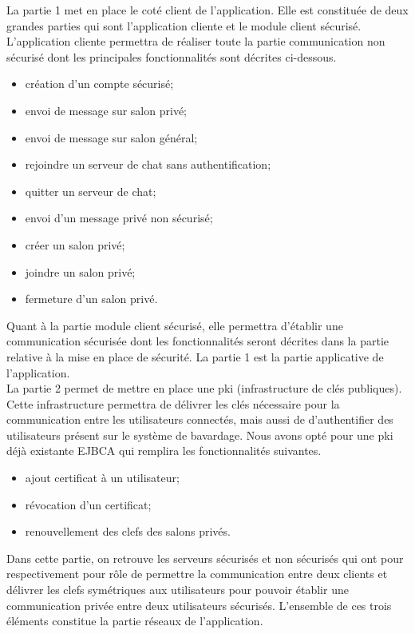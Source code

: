 \documentclass[a4paper,11pt,french]{book}
\begin{document}
La partie 1 met en place le coté client de l'application. Elle est constituée de deux grandes parties qui sont l'application cliente et le module client sécurisé. L'application cliente permettra de réaliser toute la partie communication non sécurisé dont les principales fonctionnalités sont décrites ci-dessous.
\begin{itemize}\item création d’un compte sécurisé; \item envoi de message sur salon privé; \item envoi de message sur salon général;\item rejoindre un serveur de chat sans authentification;\item quitter un serveur de chat;\item envoi d’un message privé non sécurisé;\item créer un salon privé; \item joindre un salon privé; \item fermeture d’un salon privé.\end{itemize}
\vspace{.12cm}
Quant à la partie module client sécurisé, elle permettra d'établir une communication sécurisée dont les fonctionnalités seront décrites dans la partie relative à la mise en place de sécurité. La partie 1 est la partie applicative de l'application.\\

La partie 2 permet de mettre en place une pki (infrastructure de clés publiques). Cette infrastructure permettra de délivrer les clés nécessaire pour la communication entre les utilisateurs connectés, mais aussi de d'authentifier des utilisateurs présent sur le système de bavardage. Nous avons opté pour une pki déjà existante EJBCA qui remplira les fonctionnalités suivantes.
\begin{itemize}\item ajout certificat à un utilisateur;\item révocation d’un certificat;\item renouvellement des clefs des salons privés.\end{itemize}
Dans cette partie, on retrouve les serveurs sécurisés et non sécurisés qui ont pour respectivement pour rôle de permettre la communication entre deux clients et délivrer les clefs symétriques aux utilisateurs pour pouvoir établir une communication privée entre deux utilisateurs sécurisés. L'ensemble de ces trois éléments constitue la partie réseaux de l'application.\\
\end{document}
